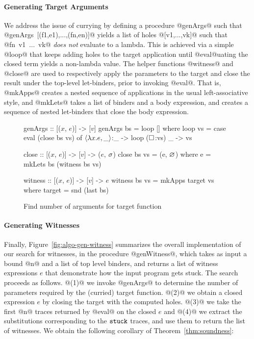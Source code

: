 \paragraph{Generating Target Arguments}
%
We address the issue of currying by defining a procedure @genArgs@ such that \\
\hbox{@genArgs [(f1,e1),...,(fn,en)]@} yields a list of holes @[v1,...,vk]@
such that \hbox{@fn v1 ... vk@} \emph{does not} evaluate to a lambda.
%
This is achieved via a simple @loop@ that keeps adding holes to the
target application until @eval@uating the closed term yields a
non-lambda value.
%
The helper functions @witness@ and @close@ are used to respectively
apply the parameters to the target and close the result under the top-level
let-binders, prior to invoking \hbox{@eval@.}
%
That is, @mkApps@ creates a nested sequence of applications in
the usual left-associative style, and @mkLets@ takes a list of
binders and a body expression, and creates a sequence of nested
let-binders that close the body expression.

\begin{figure}[t]
\centering
\begin{mcode}
genArgs :: [($x$, $e$)] -> [$v$]
genArgs bs = loop []
  where
  loop vs  = case eval (close bs vs) of
               $\langle \lambda x. e, \_ \rangle$:_ -> loop ($\square_{}$:vs)
               _        -> vs

close :: [($x$, $e$)] -> [$v$] -> ($e$, $\sigma$)
close bs vs = (e, $\varnothing$)
  where
    e       = mkLets bs (witness bs vs)

witness :: [($x$, $e$)] -> [$v$] -> $e$
witness bs vs = mkApps target vs
  where
    target    = snd (last bs)
\end{mcode}
\caption{Find number of arguments for target function}
\label{fig:algo-gen-args}
\end{figure}


\paragraph{Generating Witnesses}
%
Finally, Figure~\ref{fig:algo-gen-witness} summarizes the overall
implementation of our search for witnesses, in the procedure @genWitness@,
which takes as input a bound @n@ and a list of top level binders, and
returns a list of witness expressions $e$ that demonstrate how the input
program gets stuck.
%
The search proceeds as follows.
%
@(1)@ we invoke @genArgs@ to determine the number of parameters required
by the (curried) target function.
%
@(2)@ we obtain a closed expression $e$ by closing the target with the
computed holes.
%
@(3)@ we take the first @n@ traces returned by @eval@ on the closed $e$
and
@(4)@ we extract the substitutions corresponding to the $\mathtt{stuck}$ traces,
and use them to return the list of witnesses.
%
We obtain the following corollary of Theorem~\ref{thm:soundness}:


